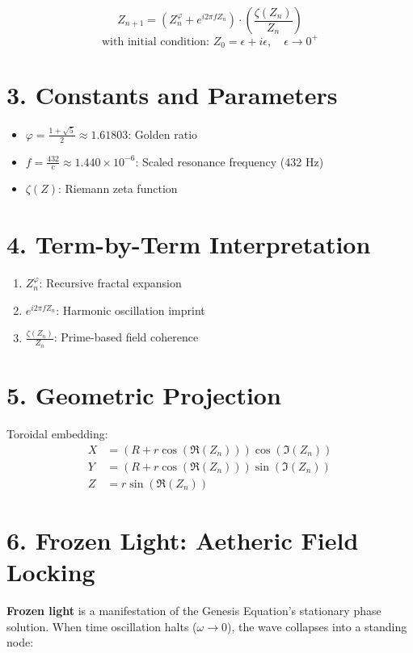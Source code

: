 \[
Z_{n+1} = \left( Z_n^\varphi + e^{i 2\pi f Z_n} \right) \cdot \left( \frac{\zeta(Z_n)}{Z_n} \right)
\]
\[
\text{with initial condition: } Z_0 = \epsilon + i\epsilon, \quad \epsilon \to 0^+
\]

\section*{3. Constants and Parameters}

\begin{itemize}
  \item \( \varphi = \frac{1+\sqrt{5}}{2} \approx 1.61803 \): Golden ratio
  \item \( f = \frac{432}{c} \approx 1.440 \times 10^{-6} \): Scaled resonance frequency (432 Hz)
  \item \( \zeta(Z) \): Riemann zeta function
\end{itemize}

\section*{4. Term-by-Term Interpretation}

\begin{enumerate}
  \item \( Z_n^\varphi \): Recursive fractal expansion
  \item \( e^{i 2\pi f Z_n} \): Harmonic oscillation imprint
  \item \( \frac{\zeta(Z_n)}{Z_n} \): Prime-based field coherence
\end{enumerate}

\section*{5. Geometric Projection}

Toroidal embedding:
\[
\begin{aligned}
X &= (R + r \cos(\Re(Z_n))) \cos(\Im(Z_n)) \\
Y &= (R + r \cos(\Re(Z_n))) \sin(\Im(Z_n)) \\
Z &= r \sin(\Re(Z_n))
\end{aligned}
\]

\section*{6. Frozen Light: Aetheric Field Locking}

\textbf{Frozen light} is a manifestation of the Genesis Equation's stationary phase solution. When time oscillation halts (\( \omega \rightarrow 0 \)), the wave collapses into a standing node:


